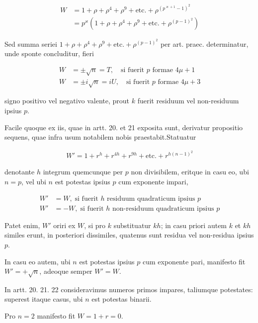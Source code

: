 \[
\begin{aligned}
W&=1+\rho+\rho^4+\rho^9+\text{etc.}+\rho^{(p^{\varkappa+1}-1)^2}\\&=p^\varkappa(1+\rho+\rho^4+\rho^9+\text{etc.}+\rho^{(p-1)^2})
\end{aligned}
\]

Sed summa seriei $1+\rho+\rho^4+\rho^9+\text{etc.}+\rho^{(p-1)^2}$ per art. praec. determinatur, unde sponte concluditur, fieri

\[
\begin{aligned}
W&=\pm\surd n=T,\quad\text{si fuerit }p\text{ formae }4\mu+1\\
W&=\pm i\surd n=iU,\quad\text{si fuerit }p\text{ formae }4\mu+3
\end{aligned}
\]

signo positivo vel negativo valente, prout $k$ fuerit residuum vel non-residuum ipsius $p$.


Facile quoque ex iis, quae in artt. 20. et 21 exposita sunt, derivatur propositio sequens, quae infra usum notabilem nobis praestabit.\quad Statuatur

\[
\begin{aligned}
W'=1+r^h+r^{4h}+r^{9h}+\text{etc.}+r^{h(n-1)^2}
\end{aligned}
\]


denotante $h$ integrum quemcunque per $p$ non divisibilem, eritque in casu eo, ubi $n=p$, vel ubi $n$ est potestas ipsius $p$ cum exponente impari,

\[
\begin{aligned}
W'&=W,\;\text{si fuerit }h\text{ residuum quadraticum ipsius }p\\
W'&=-W,\;\text{si fuerit }h\text{ non-residuum quadraticum ipsius }p
\end{aligned}
\]

Patet enim, $W'$ oriri ex $W$, si pro $k$ substituatur $kh$; in casu priori autem $k$ et $kh$ similes erunt, in posteriori dissimiles, quatenus sunt residua vel non-residua ipsius $p$.

In casu eo autem, ubi $n$ est potestas ipsius $p$ cum exponente pari, manifesto fit $W'=+\surd n$, adeoque semper $W'=W$.


In artt. 20. 21. 22 consideravimus numeros primos impares, taliumque potestates: superest itaque casus, ubi $n$ est potestas binarii.

Pro $n=2$ manifesto fit $W=1+r=0$.

